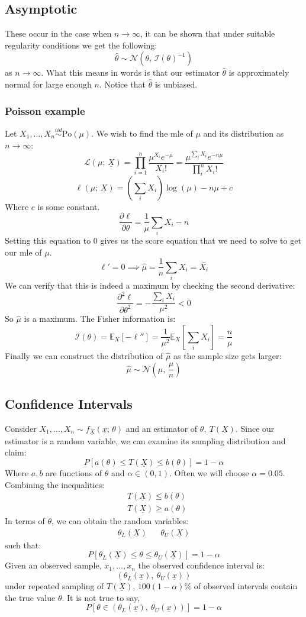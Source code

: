\documentclass[12pt]{article}
\newcommand{\pf}[2]{\frac{\partial #1}{\partial #2}}
\newcommand{\iid}{\overset{iid}{\sim}}
\begin{document}
\subsection{Asymptotic}
These occur in the case when \(n\to\infty\), it can be shown that under suitable regularity conditions we get the following:
\[\hat{\theta}\sim\mathcal{N}(\theta,\, \mathcal{I}(\theta)^{-1})\]
as \(n\to\infty\). What this means in words is that our estimator \(\hat{\theta}\) is approximately normal for large enough \(n\). Notice that \(\hat{\theta}\) is unbiased.
\subsubsection{Poisson example}
Let \(X_1,\dots,X_n\iid\text{Po}(\mu)\). We wish to find the mle of \(\mu\) and its distribution as \(n\to\infty\):
\[\mathcal{L}(\mu;\, \underline{X})=\prod^n_{i=1}\frac{\mu^{X_i}e^{-\mu}}{X_i!}=\frac{\mu^{\sum_iX_i}e^{-n\mu}}{\prod^n_iX_i!}\]
\[\ell(\mu;\, \underline{X})=\left(\sum_iX_i\right)\log(\mu)-n\mu+c\]
Where \(c\) is some constant.
\[\pf{\ell}{\theta}=\frac{1}{\mu}\sum_iX_i-n\]
Setting this equation to 0 gives us the score equation that we need to solve to get our mle of \(\mu\).
\[\ell'=0\implies \hat{\mu}=\frac{1}{n}\sum_iX_i=\bar{X_i}\]
We can verify that this is indeed a maximum by checking the second derivative:
\[\pf{^2\ell}{\theta^2}=-\frac{\sum_iX_i}{\mu^2}<0\]
So \(\hat{\mu}\) is a maximum. The Fisher information is:
\[\mathcal{I}(\theta)=\mathbb{E}_{X}\left[-\ell''\right]=\frac{1}{\mu^2}\mathbb{E}_X\left[\sum_iX_i\right]=\frac{n}{\mu}\]
Finally we can construct the distribution of \(\hat{\mu}\) as the sample size gets larger:
\[\hat{\mu}\sim\mathcal{N}\left(\mu,\, \frac{\mu}{n}\right)\]
\subsection{Confidence Intervals}
Consider \(X_1,\dots,X_n\sim f_{\underline{X}}(\underline{x};\, \theta)\) and an estimator of \(\theta,\ T(\underline{X})\). Since our estimator is a random variable, we can examine its sampling distribution and claim:
\[P[a(\theta)\leq T(\underline{X})\leq b(\theta)]=1-\alpha\]
Where \(a,b\) are functions of \(\theta\) and \(\alpha\in(0,1)\). Often we will choose \(\alpha=0.05\). Combining the inequalities:
\begin{align*}
    &T(\underline{X})\leq b(\theta) \\
    &T(\underline{X})\geq a(\theta)
\end{align*}
In terms of \(\theta\), we can obtain the random variables:
\begin{align*}
    \theta_L(\underline{X}) && \theta_U(\underline{X})
\end{align*}
such that:
\[P[\theta_L(\underline{X})\leq \theta\leq \theta_U(\underline{X})]=1-\alpha\]
Given an observed sample, \(x_1,\dots,x_n\) the observed confidence interval is:
\[(\theta_L(\underline{x}),\ \theta_U(\underline{x}))\]
under repeated sampling of \(T(\underline{X})\), \(100(1-\alpha)\%\) of observed intervals contain the true value \(\theta\). It is not true to say,
\[P[\theta\in(\theta_L(\underline{x}),\ \theta_U(\underline{x}))]=1-\alpha\]
\end{document}
